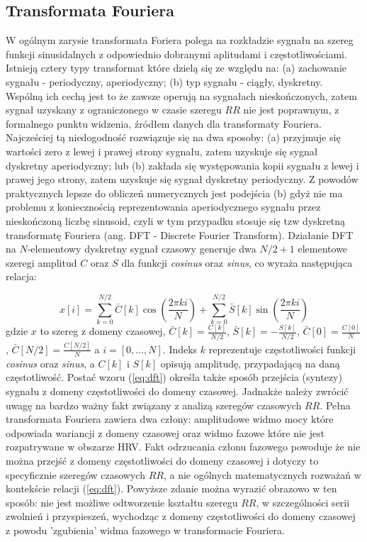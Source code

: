 \subsection{Transformata Fouriera}

W ogólnym zarysie transformata Foriera polega na rozkładzie sygnału na szereg funkcji
sinusidalnych z odpowiednio dobranymi aplitudami i częstotliwościami. Istnieją cztery typy
transformat \cite{dsp} które dzielą się ze względu na: (a) zachowanie sygnału - periodyczny,
aperiodyczny; (b) typ sygnału - ciągły, dyskretny. Wspólną ich cechą jest to że
zawsze operują na sygnałach nieskończonych, zatem sygnał uzyskany z ograniczonego w czasie
szeregu $RR$ nie jest poprawnym, z formalnego punktu widzenia, źródłem danych dla
transformaty Fouriera. Najcześciej tą niedogodność rozwiązuje się na dwa sposoby:
(a) przyjmuje się wartości zero z lewej i prawej strony sygnału, zatem uzyskuje się sygnał
dyskretny aperiodyczny; lub (b) zakłada się występowania kopii sygnału z lewej i prawej jego
strony, zatem uzyskuje się sygnał dyskretny periodyczny. Z powodów praktycznych
lepsze do obliczeń numerycznych jest podejścia (b) gdyż nie ma problemu z koniecznością
reprezentowania aperiodycznego sygnału przez nieskończoną liczbę sinusoid, czyli w tym
przypadku stosuje się tzw dyskretną transformatę Fouriera (ang. DFT - Discrete Fourier
Transform). Działanie DFT na $N$-elementowy dyskretny sygnał czasowy generuje dwa $N/2+1$
elementowe szeregi amplitud $C$ oraz $S$ dla funkcji \emph{cosinus} oraz \emph{sinus}, co
wyraża następująca relacja:

\begin{equation}
  x[i] = \sum_{k=0}^{N/2} \bar{C}[k]\cos( \frac{2\pi k i}{N}) + \sum_{k=0}^{N/2}\bar{S}[k]\sin( \frac{2\pi k i}{N})
  \label{eq:dft}
\end{equation}
gdzie $x$ to szereg z domeny czasowej, $\bar{C}[k] = \frac{C[k]}{N/2}$, $\bar{S}[k] = -\frac{S[k]}{N/2}$, $\bar{C}[0] = \frac{C[0]}{N}$, $\bar{C}[N/2] = \frac{C[N/2]}{N}$ a $i=[0,\ldots,N]$. Indeks $k$ reprezentuje
częstotliwości funkcji \emph{cosinus} oraz \emph{sinus}, a $C[k]$ i $S[k]$ opisują
amplitudę, przypadającą na daną częstotliwość. Postać wzoru (\ref{eq:dft}) określa także
sposób przejścia (syntezy) sygnału z domeny częstotliwości do domeny czasowej.
Jadnakże należy zwrócić uwagę na bardzo ważny fakt związany z analizą szeregów czasowych
$RR$. Pełna transformata Fouriera zawiera dwa człony:
amplitudowe widmo mocy które odpowiada wariancji z domeny czasowej oraz widmo fazowe
które nie jest rozpatrywane w obszarze HRV. Fakt odrzucania członu fazowego powoduje że
nie można przejść z domeny częstotliwości do domeny czasowej i dotyczy to specyficznie
szeregów czasowych $RR$, a nie ogólnych matematycznych rozważań w kontekście relacji (\ref{eq:dft}). 
Powyższe zdanie można wyrazić obrazowo w ten sposób: nie jest możliwe odtworzenie kształtu
szeregu $RR$, w szczególności serii zwolnień i przyspieszeń, wychodząc z domeny
częstotliwości do domeny czasowej z powodu 'zgubienia' widma fazowego w transformacie
Fouriera.

